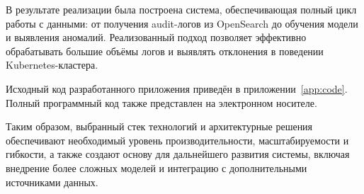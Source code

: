 В результате реализации была построена система, обеспечивающая полный цикл работы с данными: от получения audit-логов из OpenSearch до обучения модели и выявления аномалий. Реализованный подход позволяет эффективно обрабатывать большие объёмы логов и выявлять отклонения в поведении Kubernetes-кластера.

Исходный код разработанного приложения приведён в приложении~\ref{app:code}. Полный программный код также представлен на электронном носителе.

Таким образом, выбранный стек технологий и архитектурные решения обеспечивают необходимый уровень производительности, масштабируемости и гибкости, а также создают основу для дальнейшего развития системы, включая внедрение более сложных моделей и интеграцию с дополнительными источниками данных.